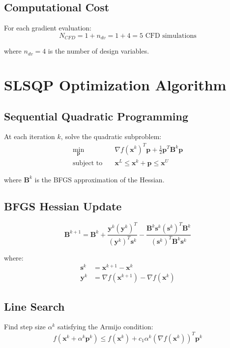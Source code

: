 \documentclass{article}
\begin{document}
\subsection{Computational Cost}
For each gradient evaluation:
\begin{equation}
N_{CFD} = 1 + n_{dv} = 1 + 4 = 5 \text{ CFD simulations}
\end{equation}

where $n_{dv} = 4$ is the number of design variables.

\section{SLSQP Optimization Algorithm}

\subsection{Sequential Quadratic Programming}
At each iteration $k$, solve the quadratic subproblem:
\begin{align}
\min_{\mathbf{p}} \quad &\nabla f(\mathbf{x}^k)^T \mathbf{p} + \frac{1}{2} \mathbf{p}^T \mathbf{B}^k \mathbf{p} \\
\text{subject to} \quad &\mathbf{x}^L \leq \mathbf{x}^k + \mathbf{p} \leq \mathbf{x}^U
\end{align}

where $\mathbf{B}^k$ is the BFGS approximation of the Hessian.

\subsection{BFGS Hessian Update}
\begin{equation}
\mathbf{B}^{k+1} = \mathbf{B}^k + \frac{\mathbf{y}^k (\mathbf{y}^k)^T}{(\mathbf{y}^k)^T \mathbf{s}^k} - \frac{\mathbf{B}^k \mathbf{s}^k (\mathbf{s}^k)^T \mathbf{B}^k}{(\mathbf{s}^k)^T \mathbf{B}^k \mathbf{s}^k}
\end{equation}

where:
\begin{align}
\mathbf{s}^k &= \mathbf{x}^{k+1} - \mathbf{x}^k \\
\mathbf{y}^k &= \nabla f(\mathbf{x}^{k+1}) - \nabla f(\mathbf{x}^k)
\end{align}

\subsection{Line Search}
Find step size $\alpha^k$ satisfying the Armijo condition:
\begin{equation}
f(\mathbf{x}^k + \alpha^k \mathbf{p}^k) \leq f(\mathbf{x}^k) + c_1 \alpha^k (\nabla f(\mathbf{x}^k))^T \mathbf{p}^k
\end{equation}
\end{document}
